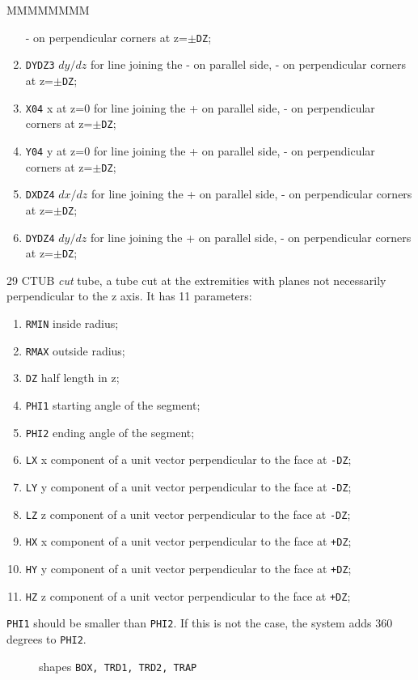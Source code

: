 \begin{DLtt}{MMMMMMMM}
\begin{enumerate}
- on perpendicular corners at z=$\pm${\tt DZ};
\item {\tt DYDZ3} $dy/dz$ for line joining the - on parallel side,
- on perpendicular corners at z=$\pm${\tt DZ};
\item {\tt X04} x at z=0 for line joining the + on parallel side,
- on perpendicular corners at z=$\pm${\tt DZ};
\item {\tt Y04} y at z=0 for line joining the + on parallel side,
- on perpendicular corners at z=$\pm${\tt DZ};
\item {\tt DXDZ4} $dx/dz$ for line joining the + on parallel side,
- on perpendicular corners at z=$\pm${\tt DZ};
\item {\tt DYDZ4} $dy/dz$ for line joining the + on parallel side,
- on perpendicular corners at z=$\pm${\tt DZ};
\end{enumerate}

\item[29 CTUB] {\it cut} tube, a tube cut at the extremities with planes
not necessarily perpendicular to the z axis. It has 11 parameters:
\begin{enumerate}
\item {\tt RMIN} inside radius;
\item {\tt RMAX} outside radius;
\item {\tt DZ} half length in z;
\item {\tt PHI1} starting angle of the segment;
\item {\tt PHI2} ending angle of the segment;
\item {\tt LX} x component of a unit vector perpendicular to the face at {\tt -DZ};
\item {\tt LY} y component of a unit vector perpendicular to the face at {\tt -DZ};
\item {\tt LZ} z component of a unit vector perpendicular to the face at {\tt -DZ};
\item {\tt HX} x component of a unit vector perpendicular to the face at {\tt +DZ};
\item {\tt HY} y component of a unit vector perpendicular to the face at {\tt +DZ};
\item {\tt HZ} z component of a unit vector perpendicular to the face at {\tt +DZ};
\end{enumerate}
{\tt PHI1} should be smaller than {\tt PHI2}. If this is not the case,
the system adds 360 degrees to {\tt PHI2}.
\end{DLtt}
\newpage
\begin{figure}[hbt]
\vspace{3cm}
      \centering
      \caption{shapes {\tt BOX, TRD1, TRD2, TRAP}}
      \label{fg:geom050-1}
\end{figure}
